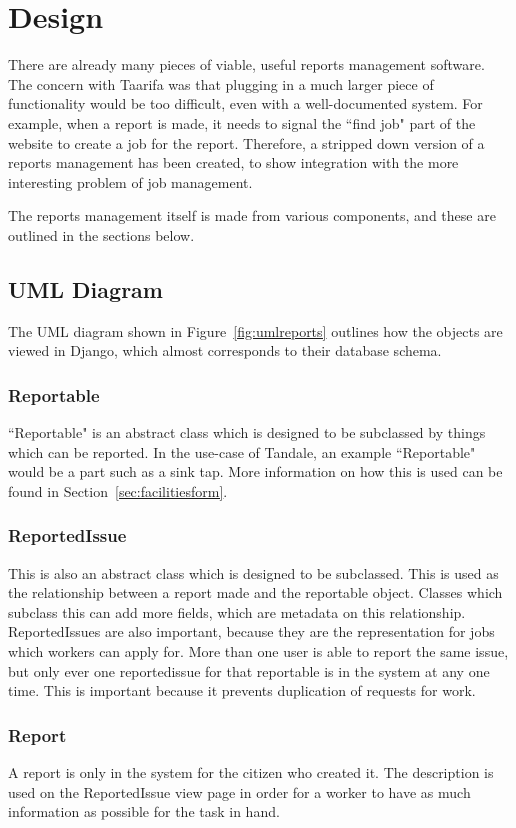 \section{Design}
There are already many pieces of viable, useful reports management software. The concern with Taarifa was that plugging in a much larger piece of functionality would be too difficult, even with a well-documented system. For example, when a report is made, it needs to signal the ``find job" part of the website to create a job for the report. Therefore, a stripped down version of a reports management has been created, to show integration with the more interesting problem of job management.

The reports management itself is made from various components, and these are outlined in the sections below.

\subsection{UML Diagram}
The UML diagram shown in Figure~\ref{fig:umlreports} outlines how the objects are viewed in Django, which almost corresponds to their database schema.

\subsubsection{Reportable}
``Reportable" is an abstract class which is designed to be subclassed by things which can be reported. In the use-case of Tandale, an example ``Reportable" would be a part such as a sink tap. More information on how this is used can be found in Section~\ref{sec:facilitiesform}.

\subsubsection{ReportedIssue}
This is also an abstract class which is designed to be subclassed. This is used as the relationship between a report made and the reportable object. Classes which subclass this can add more fields, which are metadata on this relationship.
ReportedIssues are also important, because they are the representation for jobs which workers can apply for. More than one user is able to report the same issue, but only ever one reportedissue for that reportable is in the system at any one time. This is important because it prevents duplication of requests for work.

\subsubsection{Report}
A report is only in the system for the citizen who created it. The description is used on the ReportedIssue view page in order for a worker to have as much information as possible for the task in hand.

